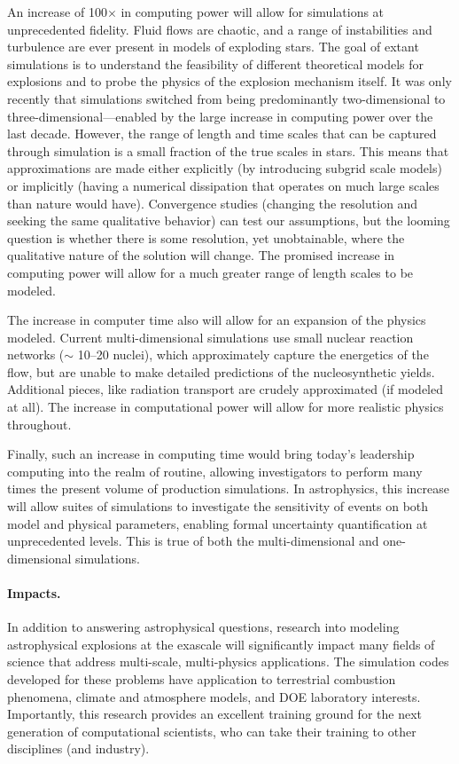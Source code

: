 \documentclass[11pt,twocolumn]{article}
\begin{document}
An increase of 100$\times$ in computing power will allow for
simulations at unprecedented fidelity. Fluid flows are chaotic, and a
range of instabilities and turbulence are ever present in models of
exploding stars. The goal of extant simulations is to understand the
feasibility of different theoretical models for explosions and to
probe the physics of the explosion mechanism itself.  It was only
recently that simulations switched from being predominantly
two-dimensional to three-dimensional---enabled by the large increase
in computing power over the last decade.  However, the range of length
and time scales that can be captured through simulation is a small
fraction of the true scales in stars.  This means that approximations
are made either explicitly (by introducing subgrid scale
models) or implicitly (having a numerical dissipation that operates on
much large scales than nature would have).  Convergence studies
(changing the resolution and seeking the same qualitative behavior)
can test our assumptions, but the looming question is whether there is
some resolution, yet unobtainable, where the qualitative nature of the
solution will change.  The promised increase in computing power will
allow for a much greater range of length scales to be modeled.

The increase in computer time also will allow for an expansion of the
physics modeled.  Current multi-dimensional simulations use small
nuclear reaction networks ($\sim$ 10--20 nuclei), which approximately
capture the energetics of the flow, but are unable to make detailed
predictions of the nucleosynthetic yields.  Additional pieces, like
radiation transport are crudely approximated (if modeled at all).  The
increase in computational power will allow for more realistic physics
throughout.

Finally, such an increase in computing time would bring today's
leadership computing into the realm of routine, allowing investigators
to perform many times the present volume of production simulations.
In astrophysics, this increase will allow suites of simulations to
investigate the sensitivity of events on both model and physical
parameters, enabling formal uncertainty quantification at
unprecedented levels.  This is true of both the multi-dimensional and
one-dimensional simulations.

\paragraph*{Impacts.}
In addition to answering astrophysical questions, research into
modeling astrophysical explosions at the exascale will significantly
impact many fields of science that address multi-scale, multi-physics
applications.  The simulation codes developed for these problems have
application to terrestrial combustion phenomena, climate and
atmosphere models, and DOE laboratory interests.  Importantly, this
research provides an excellent training ground for the next generation
of computational scientists, who can take their training to other
disciplines (and industry).
\end{document}
